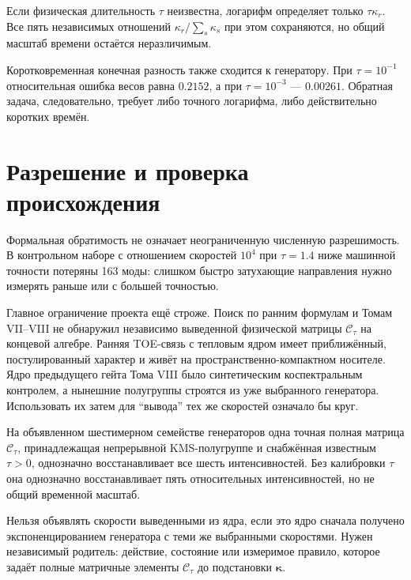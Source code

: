 Если физическая длительность $\tau$ неизвестна, логарифм определяет только
$\tau\kappa_r$. Все пять независимых отношений $\kappa_r/\sum_s\kappa_s$
при этом сохраняются, но общий масштаб времени остаётся неразличимым.

Коротковременная конечная разность также сходится к генератору. При
$\tau=10^{-1}$ относительная ошибка весов равна $0.2152$, а при
$\tau=10^{-3}$ --- $0.00261$. Обратная задача, следовательно, требует либо
точного логарифма, либо действительно коротких времён.

\section{Разрешение и проверка происхождения}

Формальная обратимость не означает неограниченную численную разрешимость.
В контрольном наборе с отношением скоростей $10^4$ при $\tau=1.4$ ниже
машинной точности потеряны 163 моды: слишком быстро затухающие направления
нужно измерять раньше или с большей точностью.

Главное ограничение проекта ещё строже. Поиск по ранним формулам и Томам
VII--VIII не обнаружил независимо выведенной физической матрицы
$\mathcal C_\tau$ на концевой алгебре. Ранняя TOE-связь с тепловым ядром
имеет приближённый, постулированный характер и живёт на
пространственно-компактном носителе. Ядро предыдущего гейта Тома VIII было
синтетическим коспектральным контролем, а нынешние полугруппы строятся из
уже выбранного генератора. Использовать их затем для ``вывода'' тех же
скоростей означало бы круг.

\begin{theorem}
На объявленном шестимерном семействе генераторов одна точная полная матрица
$\mathcal C_\tau$, принадлежащая непрерывной KMS-полугруппе и снабжённая
известным $\tau>0$, однозначно восстанавливает все шесть интенсивностей.
Без калибровки $\tau$ она однозначно восстанавливает пять относительных
интенсивностей, но не общий временной масштаб.
\end{theorem}

\begin{nogocriterion}
Нельзя объявлять скорости выведенными из ядра, если это ядро сначала
получено экспоненцированием генератора с теми же выбранными скоростями.
Нужен независимый родитель: действие, состояние или измеримое правило,
которое задаёт полные матричные элементы $\mathcal C_\tau$ до подстановки
$\boldsymbol\kappa$.
\end{nogocriterion}

